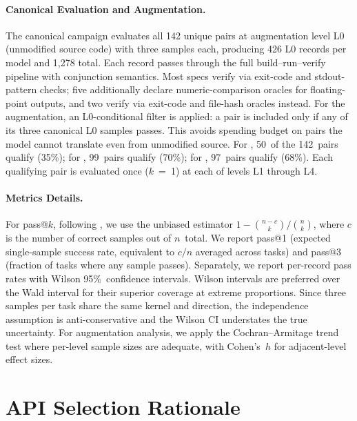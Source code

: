 \paragraph{Canonical Evaluation and Augmentation.}
The canonical campaign evaluates all 142 unique pairs at augmentation level L0 (unmodified source code) with three samples each, producing 426 L0 records per model and 1{,}278 total. Each record passes through the full build--run--verify pipeline with conjunction semantics. Most specs verify via exit-code and stdout-pattern checks; five additionally declare numeric-comparison oracles for floating-point outputs, and two verify via exit-code and file-hash oracles instead.
For the augmentation, an L0-conditional filter is applied: a pair is included only if any of its three canonical L0 samples passes. This avoids spending budget on pairs the model cannot translate even from unmodified source. For \qwenshort{}, 50~of the 142~pairs qualify (35\%); for \gptnew{}, 99~pairs qualify (70\%); for \codex{}, 97~pairs qualify (68\%). Each qualifying pair is evaluated once ($k$~=~1) at each of levels L1 through L4.

\paragraph{Metrics Details.}
For pass@$k$, following \citet{HumanEval2021}, we use the unbiased estimator $1 - \binom{n-c}{k}/\binom{n}{k}$, where $c$ is the number of correct samples out of $n$~total. We report pass@1 (expected single-sample success rate, equivalent to $c/n$ averaged across tasks) and pass@3 (fraction of tasks where any sample passes).
Separately, we report per-record pass rates with Wilson 95\%~confidence intervals. Wilson intervals are preferred over the Wald interval for their superior coverage at extreme proportions. Since three samples per task share the same kernel and direction, the independence assumption is anti-conservative and the Wilson CI understates the true uncertainty. For augmentation analysis, we apply the Cochran--Armitage trend test where per-level sample sizes are adequate, with Cohen's~$h$ for adjacent-level effect sizes.


\section{API Selection Rationale}
\label{sec:appendix-b}

